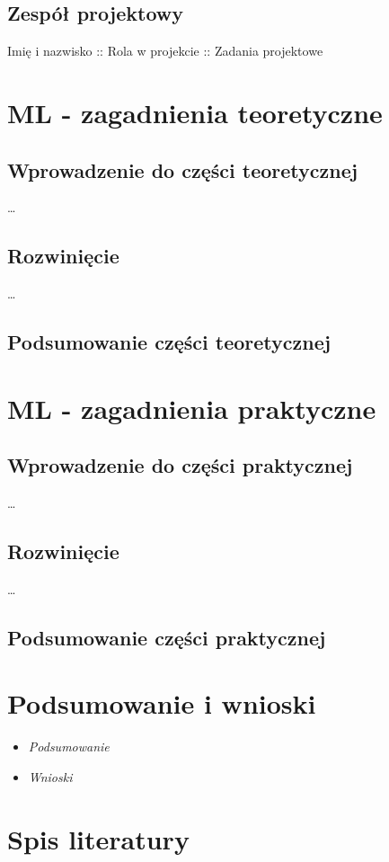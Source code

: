 \documentclass[12pt,a4paper]{article}
\begin{document}
\subsection{Zespół projektowy}
Imię i nazwisko :: Rola w projekcie :: Zadania projektowe
\newpage
\section{ML - zagadnienia teoretyczne}
\subsection{Wprowadzenie do części teoretycznej}
\ldots 
\subsection{Rozwinięcie}
\ldots 
\subsection{Podsumowanie części teoretycznej}
\newpage
\section{ML - zagadnienia praktyczne}
\subsection{Wprowadzenie do części praktycznej}
\ldots 
\subsection{Rozwinięcie}
\ldots 
\subsection{Podsumowanie części praktycznej}
\newpage
\section{Podsumowanie i wnioski}
\begin{itemize}
\item \textit{Podsumowanie}
\item \textit{Wnioski}
\end{itemize}
\newpage
\section{Spis literatury}
\printbibliography[heading=none] 
\end{document}

